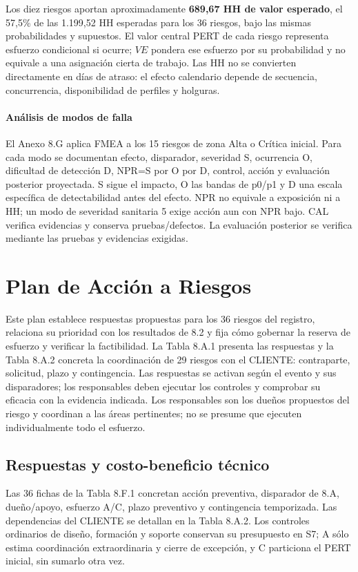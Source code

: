 Los diez riesgos aportan aproximadamente \textbf{689,67 HH de valor esperado}, el 57,5\% de las 1.199,52 HH esperadas para los 36 riesgos, bajo las mismas probabilidades y supuestos. El valor central PERT de cada riesgo representa esfuerzo condicional si ocurre; $VE$ pondera ese esfuerzo por su probabilidad y no equivale a una asignación cierta de trabajo. Las HH no se convierten directamente en días de atraso: el efecto calendario depende de secuencia, concurrencia, disponibilidad de perfiles y holguras.

\paragraph{Análisis de modos de falla} El Anexo 8.G aplica FMEA a los 15 riesgos de zona Alta o Crítica inicial. Para cada modo se documentan efecto, disparador, severidad S, ocurrencia O, dificultad de detección D, NPR=S por O por D, control, acción y evaluación posterior proyectada. S sigue el impacto, O las bandas de p0/p1 y D una escala específica de detectabilidad antes del efecto. NPR no equivale a exposición ni a HH; un modo de severidad sanitaria 5 exige acción aun con NPR bajo. CAL verifica evidencias y conserva pruebas/defectos. La evaluación posterior se verifica mediante las pruebas y evidencias exigidas.

\section{Plan de Acción a Riesgos}

Este plan establece respuestas propuestas para los 36 riesgos del registro, relaciona su prioridad con los resultados de 8.2 y fija cómo gobernar la reserva de esfuerzo y verificar la factibilidad. La Tabla 8.A.1 presenta las respuestas y la Tabla 8.A.2 concreta la coordinación de 29 riesgos con el CLIENTE: contraparte, solicitud, plazo y contingencia. Las respuestas se activan según el evento y sus disparadores; los responsables deben ejecutar los controles y comprobar su eficacia con la evidencia indicada. Los responsables son los dueños propuestos del riesgo y coordinan a las áreas pertinentes; no se presume que ejecuten individualmente todo el esfuerzo.

\subsection{Respuestas y costo-beneficio técnico}
Las 36 fichas de la Tabla 8.F.1 concretan acción preventiva, disparador de 8.A, dueño/apoyo, esfuerzo A/C, plazo preventivo y contingencia temporizada. Las dependencias del CLIENTE se detallan en la Tabla 8.A.2. Los controles ordinarios de diseño, formación y soporte conservan su presupuesto en S7; A sólo estima coordinación extraordinaria y cierre de excepción, y C particiona el PERT inicial, sin sumarlo otra vez.

